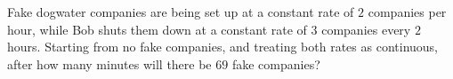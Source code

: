 Fake dogwater companies are being set up at a constant rate of $2$ companies per hour, while Bob shuts them down at a constant rate of $3$ companies every $2$ hours. Starting from no fake companies, and treating both rates as continuous, after how many minutes will there be $69$ fake companies?
